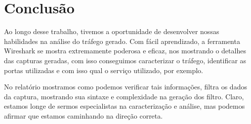 \documentclass{llncs}
\begin{document}
\section{Conclusão}
  \begin{flushleft}
    Ao longo desse trabalho, tivemos a oportunidade de desenvolver nossas habilidades na análise do tráfego gerado.
    Com fácil aprendizado, a ferramenta Wireshark se mostra extremamente poderosa e eficaz, nos mostrando o detalhes das capturas geradas, com isso conseguimos caracterizar o tráfego, identificar as portas utilizadas e com isso qual o serviço utilizado, por exemplo.
    \par No relatório mostramos como podemos verificar tais informações, filtra os dados da captura, mostrando sua sintaxe e complexidade na geração dos filtro.
    Claro, estamos longe de sermos especialistas na caracterização e análise, mas podemos afirmar que estamos caminhando na direção correta.

  \end{flushleft}
\end{document}
